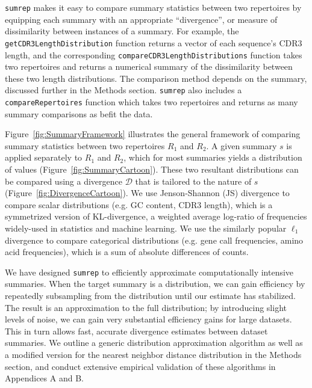 \documentclass{article}
\begin{document}
\texttt{sumrep} makes it easy to compare summary statistics between two repertoires by equipping each summary with an appropriate ``divergence'', or measure of dissimilarity between instances of a summary.
For example, the \texttt{getCDR3LengthDistribution} function returns a vector of each sequence's CDR3 length, and the corresponding \texttt{compareCDR3LengthDistributions} function takes two repertoires and returns a numerical summary of the dissimilarity between these two length distributions.
The comparison method depends on the summary, discussed further in the Methods section.
\texttt{sumrep} also includes a \texttt{compareRepertoires} function which takes two repertoires and returns as many summary comparisons as befit the data.

Figure~\ref{fig:SummaryFramework} illustrates the general framework of comparing summary statistics between two repertoires $R_1$ and $R_2$.
A given summary $s$ is applied separately to $R_1$ and $R_2$, which for most summaries yields a distribution of values (Figure~\ref{fig:SummaryCartoon}).
These two resultant distributions can be compared using a divergence $\mathcal D$ that is tailored to the nature of $s$ (Figure~\ref{fig:DivergenceCartoon}).
We use Jenson-Shannon (JS) divergence to compare scalar distributions (e.g. GC content, CDR3 length), which is a symmetrized version of KL-divergence, a weighted average log-ratio of frequencies widely-used in statistics and machine learning.
We use the similarly popular $\ell_1$ divergence to compare categorical distributions (e.g. gene call frequencies, amino acid frequencies), which is a sum of absolute differences of counts.

We have designed \texttt{sumrep} to efficiently approximate computationally intensive summaries.
When the target summary is a distribution, we can gain efficiency by repeatedly subsampling from the distribution until our estimate has stabilized.
The result is an approximation to the full distribution; by introducing slight levels of noise, we can gain very substantial efficiency gains for large datasets.
This in turn allows fast, accurate divergence estimates between dataset summaries.
We outline a generic distribution approximation algorithm as well as a modified version for the nearest neighbor distance distribution in the Methods section, and conduct extensive empirical validation of these algorithms in Appendices A and B.
\end{document}
